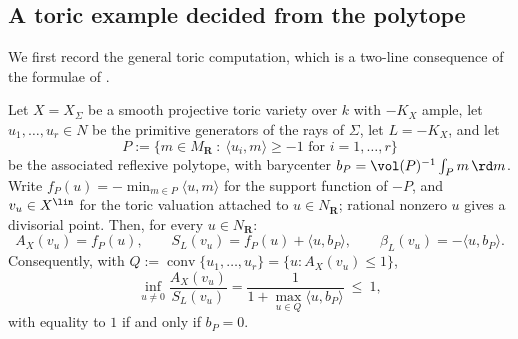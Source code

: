 \subsection{A toric example decided from the polytope}
\label{sec:ch50-ex-toric}

We first record the general toric computation, which is a two-line
consequence of the formulae of .

\begin{proposition}
\label{prop:ch50-toric-beta}
Let $X=X_\Sigma$ be a smooth projective toric variety over $k$ with
$-K_X$ ample, let $u_1,\dots,u_r\in N$ be the primitive generators of
the rays of $\Sigma$, let $L=-K_X$, and let
\[
 P:=\{m\in M_{\mathbf R}\ :\ \langle u_i,m\rangle\ge-1
     \text{ for }i=1,\dots,r\}
\]
be the associated reflexive polytope, with barycenter
$b_P=\vol(P)^{-1}\int_Pm\,\rd m$.  Write
$f_P(u)=-\min_{m\in P}\langle u,m\rangle$ for the support function of
$-P$, and $v_u\in X^{\lin}$ for the toric valuation attached to
$u\in N_{\mathbf R}$; rational nonzero $u$ gives a divisorial point.  Then, for every $u\in N_{\mathbf R}$:
\[
 A_X(v_u)=f_P(u),
 \qquad
 S_L(v_u)=f_P(u)+\langle u,b_P\rangle,
 \qquad
 \beta_L(v_u)=-\langle u,b_P\rangle .
\tag{50.86}\label{eq:ch50-toric-beta}
\]
Consequently, with $Q:=\operatorname{conv}\{u_1,\dots,u_r\}
=\{u:A_X(v_u)\le1\}$,
\[
 \inf_{u\ne0}\frac{A_X(v_u)}{S_L(v_u)}
 =\frac{1}{1+\max_{u\in Q}\langle u,b_P\rangle}\ \le\ 1,
\tag{50.87}\label{eq:ch50-toric-delta}
\]
with equality to $1$ if and only if $b_P=0$.
\end{proposition}

